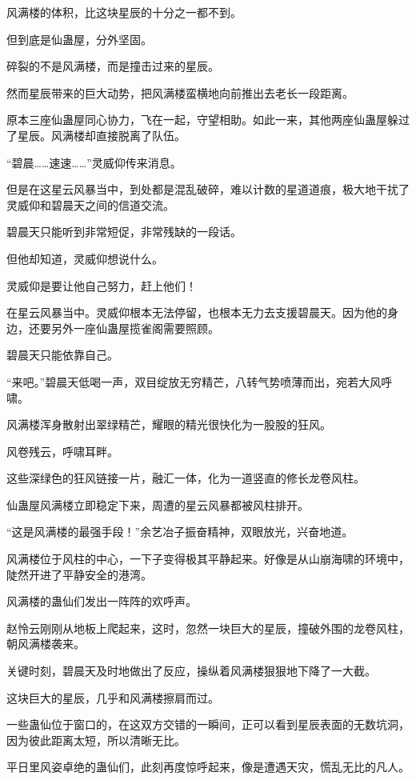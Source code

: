 \begin{this_body}
风满楼的体积，比这块星辰的十分之一都不到。

但到底是仙蛊屋，分外坚固。

碎裂的不是风满楼，而是撞击过来的星辰。

然而星辰带来的巨大动势，把风满楼蛮横地向前推出去老长一段距离。

原本三座仙蛊屋同心协力，飞在一起，守望相助。如此一来，其他两座仙蛊屋躲过了星辰。风满楼却直接脱离了队伍。

“碧晨……速速……”灵威仰传来消息。

但是在这星云风暴当中，到处都是混乱破碎，难以计数的星道道痕，极大地干扰了灵威仰和碧晨天之间的信道交流。

碧晨天只能听到非常短促，非常残缺的一段话。

但他却知道，灵威仰想说什么。

灵威仰是要让他自己努力，赶上他们！

在星云风暴当中。灵威仰根本无法停留，也根本无力去支援碧晨天。因为他的身边，还要另外一座仙蛊屋揽雀阁需要照顾。

碧晨天只能依靠自己。

“来吧。”碧晨天低喝一声，双目绽放无穷精芒，八转气势喷薄而出，宛若大风呼啸。

风满楼浑身散射出翠绿精芒，耀眼的精光很快化为一股股的狂风。

风卷残云，呼啸耳畔。

这些深绿色的狂风链接一片，融汇一体，化为一道竖直的修长龙卷风柱。

仙蛊屋风满楼立即稳定下来，周遭的星云风暴都被风柱排开。

“这是风满楼的最强手段！”余艺冶子振奋精神，双眼放光，兴奋地道。

风满楼位于风柱的中心，一下子变得极其平静起来。好像是从山崩海啸的环境中，陡然开进了平静安全的港湾。

风满楼的蛊仙们发出一阵阵的欢呼声。

赵怜云刚刚从地板上爬起来，这时，忽然一块巨大的星辰，撞破外围的龙卷风柱，朝风满楼袭来。

关键时刻，碧晨天及时地做出了反应，操纵着风满楼狠狠地下降了一大截。

这块巨大的星辰，几乎和风满楼擦肩而过。

一些蛊仙位于窗口的，在这双方交错的一瞬间，正可以看到星辰表面的无数坑洞，因为彼此距离太短，所以清晰无比。

平日里风姿卓绝的蛊仙们，此刻再度惊呼起来，像是遭遇天灾，慌乱无比的凡人。


\end{this_body}

